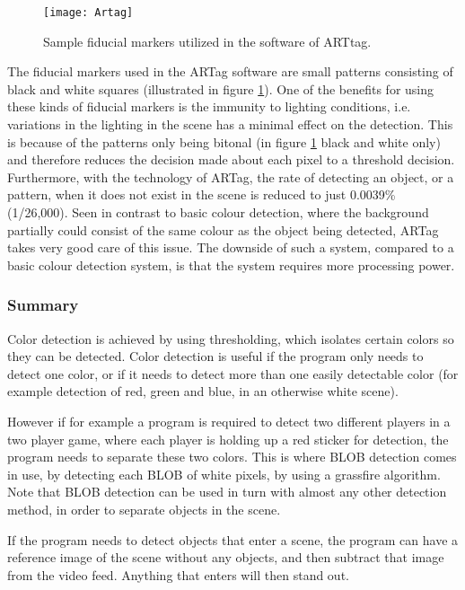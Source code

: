\begin{figure}[h]
\centering
\texttt{[image: Artag]}
\caption{Sample fiducial markers utilized in the software of ARTtag. \parencite{Fiala2005}}
\label{fig:artag}
\end{figure}

The fiducial markers used in the ARTag software are small patterns consisting of black and white squares (illustrated in figure \ref{fig:artag}).
One of the benefits for using these kinds of fiducial markers is the immunity to lighting conditions, i.e. variations in the lighting in the scene has a minimal effect on the detection. This is because of the patterns only being bitonal (in figure \ref{fig:artag} black and white only) and therefore reduces the decision made about each pixel to a threshold decision. 
Furthermore, with the technology of ARTag, the rate of detecting an object, or a pattern, when it does not exist in the scene is reduced to just 0.0039\% (1/26,000).
Seen in contrast to basic colour detection, where the background partially could consist of the same colour as the object being detected, ARTag takes very good care of this issue. The downside of such a system, compared to a basic colour detection system, is that the system requires more processing power.


\subsubsection{Summary}
Color detection is achieved by using thresholding, which isolates certain colors so they can be detected. Color detection is useful if the program only needs to detect one color, or if it needs to detect more than one easily detectable color (for example detection of red, green and blue, in an otherwise white scene).

However if for example a program is required to detect two different players in a two player game, where each player is holding up a red sticker for detection, the program needs to separate these two colors. This is where BLOB detection comes in use, by detecting each BLOB of white pixels, by using a grassfire algorithm. Note that BLOB detection can be used in turn with almost any other detection method, in order to separate objects in the scene.

If the program needs to detect objects that enter a scene, the program can have a reference image of the scene without any objects, and then subtract that image from the video feed. Anything that enters will then stand out. \parencite{Moeslund2012}
